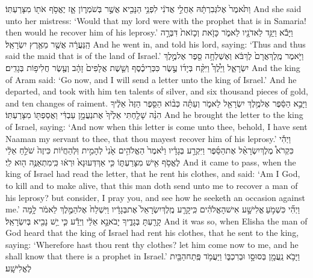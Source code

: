 {וַתֹּ֙אמֶר֙ אֶל\maqqaf גְּבִרְתָּ֔הּ אַחֲלֵ֣י אֲדֹנִ֔י לִפְנֵ֥י הַנָּבִ֖יא אֲשֶׁ֣ר בְּשֹׁמְר֑וֹן אָ֛ז יֶאֱסֹ֥ף אֹת֖וֹ מִצָּרַעְתּֽוֹ׃}
{And she said unto her mistress: ‘Would that my lord were with the prophet that is in Samaria! then would he recover him of his leprosy.’}
{וַיָּבֹ֕א וַיַּגֵּ֥ד לַאדֹנָ֖יו לֵאמֹ֑ר כָּזֹ֤את וְכָזֹאת֙ דִּבְּרָ֣ה הַֽנַּעֲרָ֔ה אֲשֶׁ֖ר מֵאֶ֥רֶץ יִשְׂרָאֵֽל׃}
{And he went in, and told his lord, saying: ‘Thus and thus said the maid that is of the land of Israel.’}
{וַיֹּ֤אמֶר מֶֽלֶךְ\maqqaf אֲרָם֙ לֶךְ\maqqaf בֹּ֔א וְאֶשְׁלְחָ֥ה סֵ֖פֶר אֶל\maqqaf מֶ֣לֶךְ יִשְׂרָאֵ֑ל וַיֵּ֩לֶךְ֩ וַיִּקַּ֨ח בְּיָד֜וֹ עֶ֣שֶׂר כִּכְּרֵי\maqqaf כֶ֗סֶף וְשֵׁ֤שֶׁת אֲלָפִים֙ זָהָ֔ב וְעֶ֖שֶׂר חֲלִיפ֥וֹת בְּגָדִֽים׃}
{And the king of Aram said: ‘Go now, and I will send a letter unto the king of Israel.’ And he departed, and took with him ten talents of silver, and six thousand pieces of gold, and ten changes of raiment.}
{וַיָּבֵ֣א הַסֵּ֔פֶר אֶל\maqqaf מֶ֥לֶךְ יִשְׂרָאֵ֖ל לֵאמֹ֑ר וְעַתָּ֗ה כְּב֨וֹא הַסֵּ֤פֶר הַזֶּה֙ אֵלֶ֔יךָ הִנֵּ֨ה שָׁלַ֤חְתִּי אֵלֶ֙יךָ֙ אֶת\maqqaf נַעֲמָ֣ן עַבְדִּ֔י וַאֲסַפְתּ֖וֹ מִצָּרַעְתּֽוֹ׃}
{And he brought the letter to the king of Israel, saying: ‘And now when this letter is come unto thee, behold, I have sent Naaman my servant to thee, that thou mayest recover him of his leprosy.’}
{וַיְהִ֡י כִּקְרֹא֩ מֶלֶךְ\maqqaf יִשְׂרָאֵ֨ל אֶת\maqqaf הַסֵּ֜פֶר וַיִּקְרַ֣ע בְּגָדָ֗יו וַיֹּ֙אמֶר֙ הַאֱלֹהִ֥ים אָ֙נִי֙ לְהָמִ֣ית וּֽלְהַחֲי֔וֹת כִּי\maqqaf זֶה֙ שֹׁלֵ֣חַ אֵלַ֔י לֶאֱסֹ֥ף אִ֖ישׁ מִצָּרַעְתּ֑וֹ כִּ֤י אַךְ\maqqaf דְּעוּ\maqqaf נָא֙ וּרְא֔וּ כִּֽי\maqqaf מִתְאַנֶּ֥ה ה֖וּא לִֽי׃}
{And it came to pass, when the king of Israel had read the letter, that he rent his clothes, and said: ‘Am I God, to kill and to make alive, that this man doth send unto me to recover a man of his leprosy? but consider, I pray you, and see how he seeketh an occasion against me.’}
{וַיְהִ֞י כִּשְׁמֹ֣עַ \legarmeh  אֱלִישָׁ֣ע אִישׁ\maqqaf הָאֱלֹהִ֗ים כִּֽי\maqqaf קָרַ֤ע מֶֽלֶךְ\maqqaf יִשְׂרָאֵל֙ אֶת\maqqaf בְּגָדָ֔יו וַיִּשְׁלַח֙ אֶל\maqqaf הַמֶּ֣לֶךְ לֵאמֹ֔ר לָ֥מָּה קָרַ֖עְתָּ בְּגָדֶ֑יךָ יָבֹא\maqqaf נָ֣א אֵלַ֔י וְיֵדַ֕ע כִּ֛י יֵ֥שׁ נָבִ֖יא בְּיִשְׂרָאֵֽל׃}
{And it was so, when Elisha the man of God heard that the king of Israel had rent his clothes, that he sent to the king, saying: ‘Wherefore hast thou rent thy clothes? let him come now to me, and he shall know that there is a prophet in Israel.’}
{וַיָּבֹ֥א נַֽעֲמָ֖ן בְּסוּסָ֣ו וּבְרִכְבּ֑וֹ וַיַּעֲמֹ֥ד פֶּֽתַח\maqqaf הַבַּ֖יִת לֶאֱלִישָֽׁע׃}
